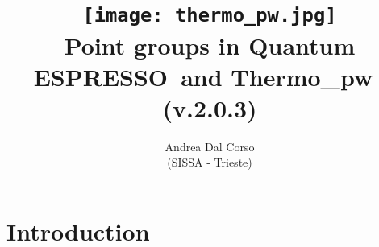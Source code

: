 \documentclass[12pt,a4paper,twoside]{report}
\def\version{2.0.3}
\def\qe{{\sc Quantum ESPRESSO}}
\begin{document}
 

\author{Andrea Dal Corso \\ (SISSA - Trieste)}
\date{}

\title{
  \texttt{[image: thermo\_pw.jpg]} \\
  \vspace{3truecm}
  \Huge \color{dark-blue} Point groups in \qe\ and {\sc Thermo\_pw}\ \\
   (v.\version)
}

\maketitle

\newpage

\tableofcontents

\newpage
\newpage
{\color{dark-blue}\chapter{Introduction}}
\color{black}
\end{document}
